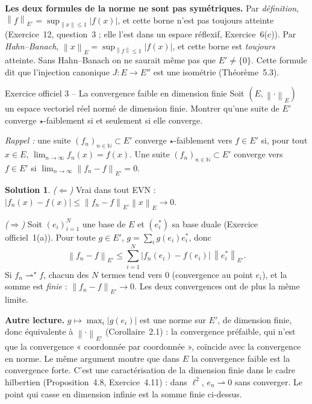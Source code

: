 \documentclass[11pt,a4paper]{article}
\newcommand{\N}{\mathbb{N}}
\newcommand{\norm}[1]{\left\|#1\right\|}
\newcommand{\wk}{\rightharpoonup}
\newcommand{\wks}{\rightharpoonup^{\!\star}}
\theoremstyle{definition}
\newtheorem*{solution}{Solution}
\begin{document}
\begin{piege}
\textbf{Les deux formules de la norme ne sont pas symétriques.} Par \emph{définition}, $\norm f_{E'}=\sup_{\norm x\le1}|f(x)|$, et cette borne n'est pas toujours atteinte (Exercice~12, question~3 ; elle l'est dans un espace réflexif, Exercice~6(c)). Par \emph{Hahn--Banach}, $\norm x_E=\sup_{\norm f\le1}|f(x)|$, et cette borne est \emph{toujours} atteinte. Sans Hahn--Banach on ne saurait même pas que $E'\ne\{0\}$. Cette formule dit que l'injection canonique $J:E\to E''$ est une isométrie (Théorème~5.3).
\end{piege}

\begin{exo}{Exercice officiel 3 -- La convergence faible en dimension finie}
Soit $(E,\norm\cdot_E)$ un espace vectoriel réel normé de dimension finie. Montrer qu'une suite de $E'$ converge $\star$-faiblement si et seulement si elle converge.

\emph{Rappel :} une suite $(f_n)_{n\in\N}\subset E'$ converge $\star$-faiblement vers $f\in E'$ si, pour tout $x\in E$, $\lim_{n\to\infty}f_n(x)=f(x)$. Une suite $(f_n)_{n\in\N}\subset E'$ converge vers $f\in E'$ si $\lim_{n\to\infty}\norm{f_n-f}_{E'}=0$.
\end{exo}

\begin{solution}
\emph{($\Leftarrow$)} Vrai dans tout EVN : $|f_n(x)-f(x)|\le\norm{f_n-f}_{E'}\norm x_E\to0$.

\emph{($\Rightarrow$)} Soit $(e_i)_{i=1}^N$ une base de $E$ et $(e_i^*)$ sa base duale (Exercice officiel~1(a)). Pour toute $g\in E'$, $g=\sum_ig(e_i)e_i^*$, donc
\[
\norm{f_n-f}_{E'}\le\sum_{i=1}^N\big|f_n(e_i)-f(e_i)\big|\,\norm{e_i^*}_{E'} .
\]
Si $f_n\wks f$, chacun des $N$ termes tend vers $0$ (convergence au point $e_i$), et la somme est \emph{finie} : $\norm{f_n-f}_{E'}\to0$. Les deux convergences ont de plus la même limite.
\end{solution}

\begin{commentaire}
\textbf{Autre lecture.} $g\mapsto\max_i|g(e_i)|$ est une norme sur $E'$, de dimension finie, donc équivalente à $\norm\cdot_{E'}$ (Corollaire~2.1) : la convergence préfaible, qui n'est que la convergence « coordonnée par coordonnée », coïncide avec la convergence en norme. Le même argument montre que dans $E$ la convergence faible est la convergence forte. C'est une caractérisation de la dimension finie dans le cadre hilbertien (Proposition~4.8, Exercice~4.11) : dans $\ell^2$, $e_n\wk0$ sans converger. Le point qui casse en dimension infinie est la somme finie ci-dessus.
\end{commentaire}
\end{document}
